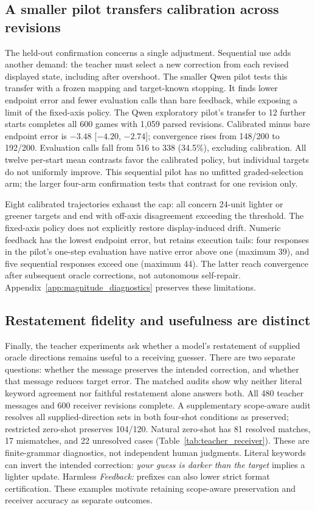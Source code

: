 \documentclass[11pt]{article}
\begin{document}
\subsection{A smaller pilot transfers calibration across revisions}
\label{sec:results_transfer}
The held-out confirmation concerns a single adjustment. Sequential use
adds another demand: the teacher must select a new correction from each
revised displayed state, including after overshoot. The smaller Qwen
pilot tests this transfer with a frozen mapping and target-known stopping.
It finds lower endpoint error and fewer evaluation calls than bare
feedback, while exposing a limit of the fixed-axis policy.
The Qwen exploratory pilot's transfer to 12 further starts completes all 600 games with 1{,}059 parsed
revisions. Calibrated minus bare endpoint error is $-3.48$
[$-4.20$, $-2.74$]; convergence rises from 148/200 to 192/200.
Evaluation calls fall from 516 to 338 (34.5\%), excluding calibration.
All twelve per-start mean contrasts favor the calibrated policy, but
individual targets do not uniformly improve. This sequential pilot has no
unfitted graded-selection arm; the larger four-arm confirmation tests that
contrast for one revision only.

Eight calibrated trajectories exhaust the cap: all concern 24-unit lighter
or greener targets and end with off-axis disagreement exceeding the
threshold. The fixed-axis policy does not explicitly restore display-induced
drift. Numeric feedback has the lowest endpoint error, but retains execution
tails: four responses in the pilot's one-step evaluation have native error above one (maximum 39),
and five sequential responses exceed one (maximum 44). The latter reach
convergence after subsequent oracle corrections, not autonomous self-repair.
Appendix~\ref{app:magnitude_diagnostics} preserves these limitations.

\subsection{Restatement fidelity and usefulness are distinct}
\label{sec:results_llm_teacher}
Finally, the teacher experiments ask whether a model's restatement of
supplied oracle directions remains useful to a receiving guesser.
There are two separate questions: whether the message preserves the
intended correction, and whether that message reduces target error.
The matched audits show why neither literal keyword agreement nor
faithful restatement alone answers both.
All 480 teacher messages and 600 receiver revisions complete.
A supplementary scope-aware audit resolves all supplied-direction sets in
both four-shot conditions as preserved; restricted zero-shot preserves
104/120. Natural zero-shot has 81 resolved matches, 17 mismatches, and
22 unresolved cases (Table~\ref{tab:teacher_receiver}).
These are finite-grammar diagnostics, not independent human judgments.
Literal keywords can invert the intended correction: \textit{your guess is
darker than the target} implies a lighter update. Harmless \textit{Feedback:}
prefixes can also lower strict format certification. These examples
motivate retaining scope-aware preservation and receiver accuracy as
separate outcomes.
\end{document}
